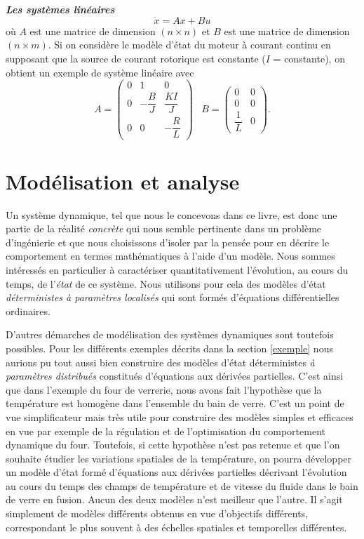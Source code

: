 \noindent \textbf{\textit{Les systèmes linéaires}}
$$
\dot x = Ax +Bu
$$
où $A$ est une matrice de dimension $(n \times n)$ et $B$ est une
matrice de dimension $(n \times m)$.  Si on considère le modèle d'état
du moteur à courant continu en supposant que la source de courant rotorique
est constante ($I$ = constante), on obtient un exemple de système linéaire
avec
\begin{equation*}
A = \left( \begin{array}{ccc}
0 & 1 & 0 \\[0.3em] 0 &-\dfrac{B}{J} & \dfrac{KI}{J}\\[0.9em]
0&0& -\dfrac{R}{L}
\end{array}
\right)\;\;\; B = \left(\begin{array}{cc} 0 & 0 \\[0.3em] 0 & 0 \\[0.3em] \dfrac{1}{L}&0
\end{array} \right).
\end{equation*}
\vv

\section{Modélisation et analyse}

Un système dynamique, tel que nous le concevons dans ce livre, est donc une partie de la réalité {\it concrète} qui nous semble pertinente dans un problème d'ingénierie et que nous choisissons d'isoler par la pensée pour en décrire le comportement en termes mathématiques à l'aide d'un modèle. Nous sommes intéressés en particulier à caractériser quantitativement l'évolution, au cours du temps, de l'{\it état} de ce système. Nous utilisons pour cela des modèles d'état {\it déterministes à paramètres localisés} qui sont formés d'équations différentielles ordinaires.

D'autres démarches de modélisation des systèmes dynamiques sont toutefois possibles. Pour les différents exemples décrits dans la section \ref{exemple} nous aurions pu tout aussi bien construire des modèles d'état déterministes {\it à paramètres distribués} constitués d'équations aux dérivées partielles. C'est ainsi que dans l'exemple du four de verrerie, nous avons fait l'hypothèse que la température est homogène  dans l'ensemble du bain de verre. C'est un point de vue simplificateur mais très utile pour construire des modèles simples et efficaces en vue par exemple de la régulation et de l'optimisation du comportement dynamique du four. Toutefois, si cette hypothèse n'est pas retenue et que l'on souhaite étudier les variations spatiales de la température, on pourra développer un modèle d'état formé d'équations aux dérivées partielles décrivant l'évolution au cours du temps des champs de température et de vitesse du fluide dans le bain de verre en fusion. Aucun des deux modèles n'est meilleur que l'autre.  Il s'agit simplement de modèles différents obtenus en vue
d'objectifs différents, correspondant le plus souvent à des échelles
spatiales et temporelles différentes.

